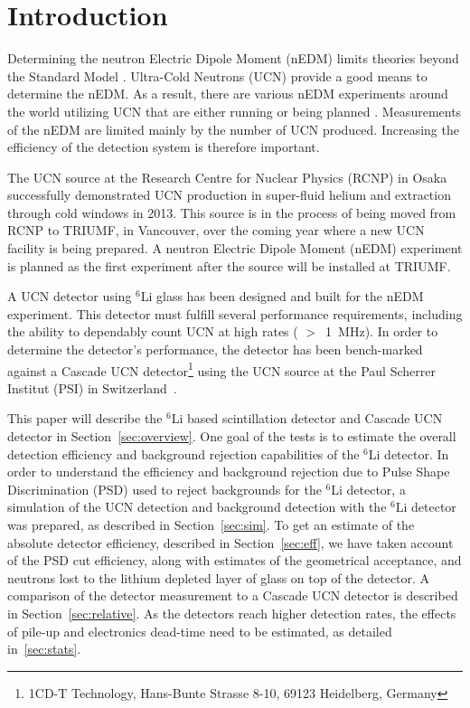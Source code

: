 \documentclass[letter,twocolumn,preprint,3p]{elsarticle}
\begin{document}
\linenumbers


\section{Introduction}

Determining the neutron Electric Dipole Moment (nEDM) limits theories
beyond the Standard Model \cite{pospelov}.  Ultra-Cold Neutrons (UCN)
provide a good means to determine the nEDM.  As a result, there are
various nEDM experiments around the world utilizing UCN that are
either running or being planned \cite{fillipone,PSI,Gatchina,
  APSerebov, KKirch, CABaker, YMasuda, IAltarev, RGolub, SNS}.
Measurements of the nEDM are limited mainly by the number of UCN
produced.  Increasing the efficiency of the detection system is
therefore important.

The UCN source at the Research Centre for Nuclear Physics (RCNP) in
Osaka successfully demonstrated UCN production in super-fluid helium
and extraction through cold windows in 2013.  This source is in the
process of being moved from RCNP to TRIUMF, in Vancouver, over the
coming year where a new UCN facility is being prepared.  A neutron
Electric Dipole Moment (nEDM) experiment is planned as the first
experiment after the source will be installed at TRIUMF.

A UCN detector using $^6$Li glass has been designed and built for the
nEDM experiment.  This detector must fulfill several performance
requirements, including the ability to dependably count UCN at high
rates ( $>$~1~MHz).  In order to determine the detector's performance,
the detector has been bench-marked against a Cascade UCN
detector\footnote{1CD-T Technology, Hans-Bunte Strasse 8-10, 69123
  Heidelberg, Germany} using the UCN source at the Paul Scherrer
Institut (PSI) in Switzerland~\cite{BLaussAIP2012, BLaussHFI2012,
  BLaussPP2014}.

This paper will describe the $^{6}$Li based scintillation detector and
Cascade UCN detector in Section~\ref{sec:overview}.  One goal of the
tests is to estimate the overall detection efficiency and background
rejection capabilities of the $^{6}$Li detector.  In order to
understand the efficiency and background rejection due to Pulse Shape
Discrimination (PSD) used to reject backgrounds for the $^{6}$Li
detector, a simulation of the UCN detection and background detection
with the $^{6}$Li detector was prepared, as described in
Section~\ref{sec:sim}.  To get an estimate of the absolute detector
efficiency, described in Section~\ref{sec:eff}, we have taken account
of the PSD cut efficiency, along with estimates of the geometrical
acceptance, and neutrons lost to the lithium depleted layer of glass
on top of the detector.  A comparison of the detector measurement to a
Cascade UCN detector is described in Section~\ref{sec:relative}.  As
the detectors reach higher detection rates, the effects of pile-up and
electronics dead-time need to be estimated, as detailed in~\ref{sec:stats}.
\end{document}
